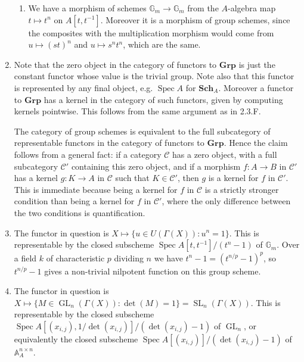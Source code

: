 \documentclass{report}
\newcommand{\cat}[1]{\mathbf{#1}} %
\newcommand{\scrC}{\mathscr{C}}
\newcommand{\A}{\mathbb{A}}
\newcommand{\G}{\mathbb{G}}
\DeclareMathOperator{\GL}{GL}
\DeclareMathOperator{\Spec}{Spec}
\DeclareMathOperator{\SL}{SL}
\begin{document}
\begin{enumerate}[label=\textbf{6.6.\Alph*.}]
\begin{enumerate}[label=(\alph*)]
		      \item We have a morphism of schemes $\G_m\to\G_m$ from the
		            $A$-algebra map $t\mapsto t^n$ on $A[t,t^{-1}]$. Moreover it
		            is a morphism of group schemes, since the composites with the
		            multiplication morphism would come from $u\mapsto(st)^n$ and
		            $u\mapsto s^nt^n$, which are the same.
	      \end{enumerate}

	\item Note that the zero object in the category of functors to
	      $\cat{Grp}$ is just the constant functor whose value is the trivial
	      group. Note also that this functor is represented by any final object,
	      e.g. $\Spec A$ for $\cat{Sch}_A$. Moreover a functor to $\cat{Grp}$
	      has a kernel in the category of such functors, given by computing
	      kernels pointwise. This follows from the same argument as in 2.3.F.

	      The category of group schemes is equivalent to the full subcategory
	      of representable functors in the category of functors to $\cat{Grp}$.
	      Hence the claim follows from a general fact: if a category $\scrC$ has
	      a zero object, with a full subcategory $\scrC'$ containing this zero
	      object, and if a morphism $f:A\to B$ in $\scrC'$ has a kernel
	      $g:K\to A$ in $\scrC$ such that $K\in\scrC'$, then $g$ is a kernel for
	      $f$ in $\scrC'$. This is immediate because being a kernel for $f$ in
	      $\scrC$ is a strictly stronger condition than being a kernel for $f$
	      in $\scrC'$, where the only difference between the two conditions is
	      quantification.

	\item The functor in question is $X\mapsto\{u\in U(\Gamma(X)):u^n=1\}$.
	      This is representable by the closed subscheme
	      $\Spec A[t,t^{-1}]/(t^n-1)$ of $\G_m$. Over a field $k$ of
	      characteristic $p$ dividing $n$ we have $t^n-1=(t^{n/p}-1)^p$, so
	      $t^{n/p}-1$ gives a non-trivial nilpotent function on this group
	      scheme.

	\item The functor in question is
	      $X\mapsto\{M\in\GL_n(\Gamma(X)):\det(M)=1\}=\SL_n(\Gamma(X))$. This is
	      representable by the closed subscheme
	      $\Spec A[(x_{i,j}),1/\det(x_{i,j})]/(\det(x_{i,j})-1)$ of $\GL_n$, or
	      equivalently the closed subscheme
	      $\Spec A[(x_{i,j})]/(\det(x_{i,j})-1)$ of $\A^{n\times n}_A$.


\end{enumerate}
\end{document}

